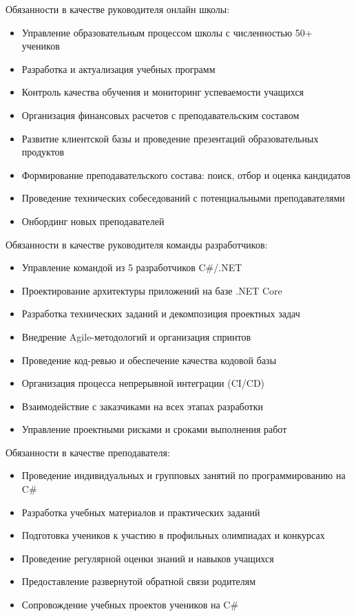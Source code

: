 \documentclass[10pt,a4paper,ragged2e,withhyper]{altacv}
\begin{document}
\begin{paracol}{2}
\textcolor{PastelRed}{Обязанности в качестве руководителя онлайн школы:}
\begin{itemize}
    \item Управление образовательным процессом школы с численностью 50+ учеников
    \item Разработка и актуализация учебных программ 
    \item Контроль качества обучения и мониторинг успеваемости учащихся
    \item Организация финансовых расчетов с преподавательским составом
    \item Развитие клиентской базы и проведение презентаций образовательных продуктов
    \item Формирование преподавательского состава: поиск, отбор и оценка кандидатов
    \item Проведение технических собеседований с потенциальными преподавателями 
    \item Онбординг новых преподавателей
\end{itemize}

\textcolor{PastelRed}{Обязанности в качестве руководителя команды разработчиков:}
\begin{itemize}
    \item Управление командой из 5 разработчиков C#/.NET
    \item Проектирование архитектуры приложений на базе .NET Core
    \item Разработка технических заданий и декомпозиция проектных задач
    \item Внедрение Agile-методологий и организация спринтов
    \item Проведение код-ревью и обеспечение качества кодовой базы
    \item Организация процесса непрерывной интеграции (CI/CD)
    \item Взаимодействие с заказчиками на всех этапах разработки
    \item Управление проектными рисками и сроками выполнения работ
\end{itemize}

\textcolor{PastelRed}{Обязанности в качестве преподавателя:}
\begin{itemize}
    \item Проведение индивидуальных и групповых занятий по программированию на C#
    \item Разработка учебных материалов и практических заданий
    \item Подготовка учеников к участию в профильных олимпиадах и конкурсах
    \item Проведение регулярной оценки знаний и навыков учащихся
    \item Предоставление развернутой обратной связи родителям
    \item Сопровождение учебных проектов учеников на C#
\end{itemize}


\end{paracol}
\end{document}
